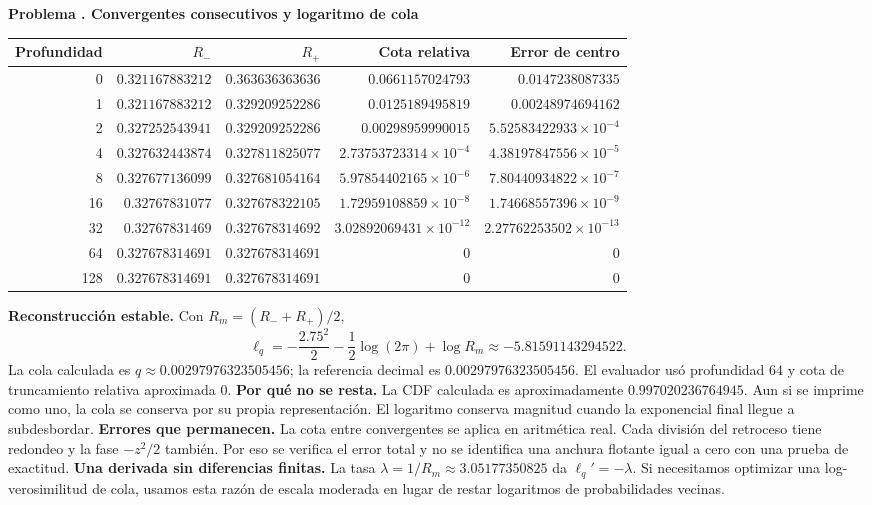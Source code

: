 \documentclass[11pt,a4paper]{article}
\theoremstyle{definition}
\newcounter{problema}
\newenvironment{resuelto}[1]{\refstepcounter{problema}\par\medskip\Needspace{6\baselineskip}\textbf{Problema \theproblema. #1}\par}{\par\medskip}
\begin{document}
\begin{resuelto}{Convergentes consecutivos y logaritmo de cola}
\begin{center}\small\begin{tabular}{rrrrr}
\toprule
Profundidad&$R_-$&$R_+$&Cota relativa&Error de centro\\
\midrule
0&$0.321167883212$&$0.363636363636$&$0.0661157024793$&$0.0147238087335$\\
1&$0.321167883212$&$0.329209252286$&$0.0125189495819$&$0.00248974694162$\\
2&$0.327252543941$&$0.329209252286$&$0.00298959990015$&$5.52583422933\times10^{-4}$\\
4&$0.327632443874$&$0.327811825077$&$2.73753723314\times10^{-4}$&$4.38197847556\times10^{-5}$\\
8&$0.327677136099$&$0.327681054164$&$5.97854402165\times10^{-6}$&$7.80440934822\times10^{-7}$\\
16&$0.32767831077$&$0.327678322105$&$1.72959108859\times10^{-8}$&$1.74668557396\times10^{-9}$\\
32&$0.32767831469$&$0.327678314692$&$3.02892069431\times10^{-12}$&$2.27762253502\times10^{-13}$\\
64&$0.327678314691$&$0.327678314691$&$0$&$0$\\
128&$0.327678314691$&$0.327678314691$&$0$&$0$\\
\bottomrule\end{tabular}\end{center}
\textbf{Reconstrucción estable.} Con $R_m=(R_-+R_+)/2$,
\[
\ell_q=-\frac{2.75^2}{2}-\frac12\log(2\pi)+\log R_m\approx-5.81591143294522.
\]
La cola calculada es $q\approx0.00297976323505456$; la referencia decimal es $0.00297976323505456$. El evaluador usó profundidad $64$ y cota de truncamiento relativa aproximada $0$.
\textbf{Por qué no se resta.} La CDF calculada es aproximadamente $0.997020236764945$. Aun si se imprime como uno, la cola se conserva por su propia representación. El logaritmo conserva magnitud cuando la exponencial final llegue a subdesbordar.
\textbf{Errores que permanecen.} La cota entre convergentes se aplica en aritmética real. Cada división del retroceso tiene redondeo y la fase $-z^2/2$ también. Por eso se verifica el error total y no se identifica una anchura flotante igual a cero con una prueba de exactitud.
\textbf{Una derivada sin diferencias finitas.} La tasa $\lambda=1/R_m\approx3.05177350825$ da $\ell_q\prime=-\lambda$. Si necesitamos optimizar una log-verosimilitud de cola, usamos esta razón de escala moderada en lugar de restar logaritmos de probabilidades vecinas.
\end{resuelto}
\end{document}
